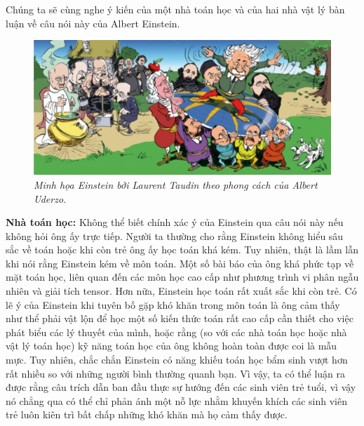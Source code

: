\begin{multicols}{2}
	
	\vspace*{-8pt}
	\vskip 0.2cm	
	Chúng ta sẽ cùng nghe ý kiến của một nhà toán học và của hai nhà vật lý bàn luận về câu nói này của Albert Einstein.
	\begin{figure}[H]
		\vspace*{-5pt}
		\centering
		\captionsetup{labelformat= empty, justification=centering}
		\includegraphics[width= 1\linewidth]{2}
		\caption{\small\textit{\color{quantoan}Minh họa Einstein bởi Laurent Taudin theo phong cách của Albert Uderzo.}}
		\vspace*{-10pt}
	\end{figure}
	\textbf{\color{quantoan}Nhà toán học:} Không thể biết chính xác ý của Einstein qua câu nói này nếu không hỏi ông ấy trực tiếp. Người ta thường cho rằng Einstein không hiểu sâu sắc về toán hoặc khi còn trẻ ông ấy học toán khá kém. Tuy nhiên, thật là lầm lẫn khi nói rằng Einstein kém về môn toán. Một số bài báo của ông khá phức tạp về mặt toán học, liên quan đến các môn học cao cấp như phương trình vi phân ngẫu nhiên và giải tích tensor. Hơn nữa, Einstein học toán rất xuất sắc khi còn trẻ.
	\vskip 0.1cm
	Có lẽ ý của Einstein khi tuyên bố gặp khó khăn trong môn toán là ông cảm thấy như thể phải vật lộn để học một số kiến thức toán rất cao cấp cần thiết cho việc phát biểu các lý thuyết của mình, hoặc rằng (so với các nhà toán học hoặc nhà vật lý toán học) kỹ năng toán học của ông không hoàn toàn được coi là mẫu mực. Tuy nhiên, chắc chắn Einstein có năng khiếu toán học bẩm sinh vượt hơn rất nhiều so với những người bình thường quanh bạn. Vì vậy, ta có thể luận ra được rằng câu trích dẫn ban đầu thực sự hướng đến các sinh viên trẻ tuổi, vì vậy nó chẳng qua  có thể chỉ phản ánh một nỗ lực nhằm  khuyến khích các sinh viên trẻ luôn kiên trì bất chấp những khó khăn mà họ cảm thấy được.

\end{multicols}

